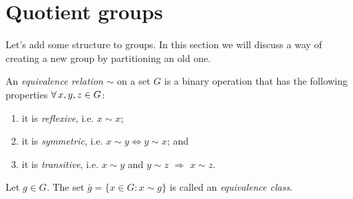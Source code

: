 %

\section{Quotient groups}\label{sec:q}
Let's add some structure to groups. In this section we will discuss a way of
creating a new group by partitioning an old one.

  An {\it equivalence relation}  $\sim$ on a 
  set $G$ is a binary operation that has the following properties 
  $\operatorname{\forall} x,y,z\in G$:
  \begin{enumerate}
    \item it is {\it reflexive}, i.e. $x\sim x$;
    \item it is {\it symmetric}, i.e. 
          $x\sim y\Leftrightarrow y\sim x$; and
    \item it is {\it transitive}, i.e. $x\sim y$ and 
          $y\sim z$ $\Rightarrow$ $x\sim z$.
  \end{enumerate}
  Let $g\in G$. The set $\bar{g}=\{x\in G:x\sim g\}$ is called an {\it
  equivalence class}.

